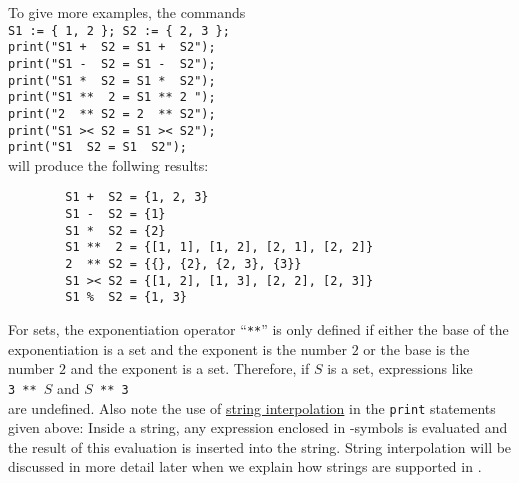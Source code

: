To give more examples, the commands
\\[0.2cm]
\hspace*{1.3cm}
\texttt{S1 := \{ 1, 2 \}; S2 := \{ 2, 3 \};}
\\
\hspace*{1.3cm}
\texttt{print("S1 + \ S2 = S1 + \ S2");}
\\
\hspace*{1.3cm}
\texttt{print("S1 - \ S2 = S1 - \ S2");}
\\
\hspace*{1.3cm}
\texttt{print("S1 * \ S2 = S1 * \ S2");}
\\
\hspace*{1.3cm}
\texttt{print("S1 ** \ 2  = S1 ** 2\ ");}
\\
\hspace*{1.3cm}
\texttt{print("2 \ ** S2  = 2 \ ** S2");}
\\
\hspace*{1.3cm}
\texttt{print("S1 >< S2 = S1 >< S2");}
\\
\hspace*{1.3cm}
\texttt{print("S1  \ S2 = S1  \ S2");}
\\[0.2cm]
will produce the follwing results:
\begin{verbatim}
        S1 +  S2 = {1, 2, 3}
        S1 -  S2 = {1}
        S1 *  S2 = {2}
        S1 **  2 = {[1, 1], [1, 2], [2, 1], [2, 2]}
        2  ** S2 = {{}, {2}, {2, 3}, {3}}
        S1 >< S2 = {[1, 2], [1, 3], [2, 2], [2, 3]}
        S1 %  S2 = {1, 3}
\end{verbatim}
For sets, the exponentiation operator ``\texttt{**}'' is only defined if either the base
of the exponentiation is a set and the exponent is the number $2$ or the base is the
number $2$ and the exponent is a set.  Therefore, if $S$ is a set, expressions like
\\[0.2cm]
\hspace*{1.3cm}
\texttt{3 ** $S$} \quad and \quad \texttt{$S$ ** 3}
\\[0.2cm]
are undefined. 
Also note the use of \href{https://en.wikipedia.org/wiki/String_interpolation}{string interpolation} in the
\texttt{print} statements given above:  Inside a string, any expression enclosed in
-symbols is evaluated and the result of this evaluation is
inserted into the string.
String interpolation will be discussed in more detail later when we explain how strings are
supported in \setlx.

